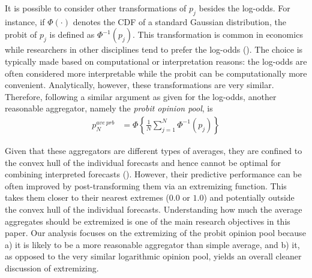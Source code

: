 \documentclass[11pt]{article}
\theoremstyle{definition}
\theoremstyle{definition}
\begin{document}
It is possible to consider other transformations of $p_j$ besides the log-odds. For instance,  if $\Phi(\cdot)$ denotes the CDF of a standard Gaussian distribution, the probit of $p_j$ is defined as $\Phi^{-1}(p_j)$. This transformation is common in economics while researchers in other disciplines tend to prefer the log-odds (\citet{bryan2013regression}). The choice is typically made based on computational or interpretation reasons: the log-odds are often considered more interpretable while the probit can be computationally more convenient. Analytically, however, these transformations are very similar. Therefore, following a similar argument as given for the log-odds, another reasonable aggregator, namely the \textit{probit opinion pool}, is
\begin{align*}
p_N^{ave\ prb} &= \Phi \left\{ \frac{1}{N} \sum_{j=1}^N \Phi^{-1}(p_j) \right\}
\end{align*}

Given that these aggregators are different types of averages, they are confined to the convex hull of the individual forecasts and hence cannot be optimal for combining interpreted forecasts (\citet{parunak2013characterizing}). However, their predictive performance can be often improved by post-transforming them via an extremizing function. This takes them closer to their nearest extremes ($0.0$ or $1.0$) and potentially  outside the convex hull of the individual forecasts. Understanding how much the average aggregates should be extremized is one of the main research objectives in this paper. Our analysis focuses on the extremizing of the probit opinion pool because a) it is likely to be a more reasonable aggregator than simple average, and b) it, as opposed to the very similar logarithmic opinion pool, yields an overall cleaner discussion  of extremizing. 



\end{document}
